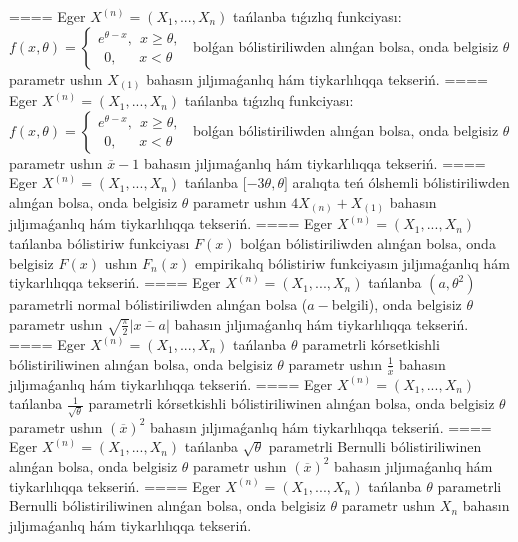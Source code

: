 ====
Eger \(X^{(n)} = \left( X_{1},...,X_{n} \right)\) tańlanba tıǵızlıq funkciyası: \(f(x,\theta) = \left\{ \begin{matrix}
e^{\theta - x},\ \ x \geq \theta, \\
\ \ 0,\ \ \ \ \ \ \ x < \theta
\end{matrix} \right.\ \)
bolǵan bólistiriliwden alınǵan bolsa, onda belgisiz \(\theta\) parametr ushın \(X_{(1)}\) bahasın jıljımaǵanlıq hám tiykarlılıqqa tekseriń.
====
Eger \(X^{(n)} = \left( X_{1},...,X_{n} \right)\) tańlanba tıǵızlıq funkciyası: \(f(x,\theta) = \left\{ \begin{matrix}
e^{\theta - x},\ \ x \geq \theta, \\
\ \ 0,\ \ \ \ \ \ \ x < \theta
\end{matrix} \right.\ \)
bolǵan bólistiriliwden alınǵan bolsa, onda belgisiz \(\theta\) parametr ushın \(\overline{x} - 1\) bahasın jıljımaǵanlıq hám tiykarlılıqqa tekseriń.
====
Eger \(X^{(n)} = \left( X_{1},...,X_{n} \right)\) tańlanba \(\lbrack - 3\theta,\theta\rbrack\) aralıqta teń ólshemli bólistiriliwden alınǵan bolsa, onda belgisiz \(\theta\) parametr ushın \(4X_{(n)} + X_{(1)}\) bahasın jıljımaǵanlıq hám tiykarlılıqqa tekseriń.
====
Eger \(X^{(n)} = \left( X_{1},...,X_{n} \right)\) tańlanba bólistiriw funkciyası \(F(x)\) bolǵan bólistiriliwden alınǵan bolsa, onda belgisiz \(F(x)\) ushın \(F_{n}(x)\) empirikalıq bólistiriw funkciyasın jıljımaǵanlıq hám tiykarlılıqqa tekseriń.
====
Eger \(X^{(n)} = \left( X_{1},...,X_{n} \right)\) tańlanba \(\left( a,\theta^{2} \right)\) parametrli normal bólistiriliwden alınǵan bolsa (\(a -\)belgili), onda belgisiz \(\theta\) parametr ushın \(\sqrt{\frac{\pi}{2}}\left| \overline{x - a} \right|\) bahasın jıljımaǵanlıq hám tiykarlılıqqa tekseriń.
====
Eger \(X^{(n)} = \left( X_{1},...,X_{n} \right)\) tańlanba \(\theta\) parametrli kórsetkishli bólistiriliwinen alınǵan bolsa, onda belgisiz \(\theta\) parametr ushın \(\frac{1}{\overline{x}}\) bahasın jıljımaǵanlıq hám tiykarlılıqqa tekseriń.
====
Eger \(X^{(n)} = \left( X_{1},...,X_{n} \right)\) tańlanba \(\frac{1}{\sqrt{\theta}}\) parametrli kórsetkishli bólistiriliwinen alınǵan bolsa, onda belgisiz \(\theta\) parametr ushın \((\overline{x})^{2}\) bahasın jıljımaǵanlıq hám tiykarlılıqqa tekseriń.
====
Eger \(X^{(n)} = \left( X_{1},...,X_{n} \right)\) tańlanba \(\sqrt{\theta}\) parametrli Bernulli bólistiriliwinen alınǵan bolsa, onda belgisiz \(\theta\) parametr ushın \((\overline{x})^{2}\) bahasın jıljımaǵanlıq hám tiykarlılıqqa tekseriń.
====
Eger \(X^{(n)} = \left( X_{1},...,X_{n} \right)\) tańlanba \(\theta\) parametrli Bernulli bólistiriliwinen alınǵan bolsa, onda belgisiz \(\theta\) parametr ushın \(X_{n}\) bahasın jıljımaǵanlıq hám tiykarlılıqqa tekseriń.
